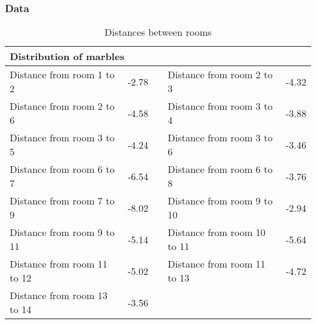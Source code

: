 \documentclass[../Head/Main.tex]{subfiles}
\begin{document}
\subsubsection*{Data}
\begin{table}[H]
	\centering
	\begin{tabular}{l r c l r}
		\hline
		\multicolumn{5}{l}{\textbf{Distribution of marbles}}  			\\ \hline
		Distance from room 1 to 2   & -2.78 & &
		Distance from room 2 to 3   & -4.32\\
		Distance from room 2 to 6   & -4.58 & &
		Distance from room 3 to 4   & -3.88\\
		Distance from room 3 to 5   & -4.24 & &
		Distance from room 3 to 6   & -3.46\\
		Distance from room 6 to 7   & -6.54 & &
		Distance from room 6 to 8   & -3.76\\
		Distance from room 7 to 9   & -8.02 & &
		Distance from room 9 to 10  & -2.94\\
		Distance from room 9 to 11  & -5.14 & &
		Distance from room 10 to 11 & -5.64\\
		Distance from room 11 to 12 & -5.02 & &
		Distance from room 11 to 13 & -4.72\\
		Distance from room 13 to 14 & -3.56 & & \\						\hline
	\end{tabular}
	\caption{Distances between rooms}
	\label{tab:dist_geogebra}
\end{table}
\end{document}
